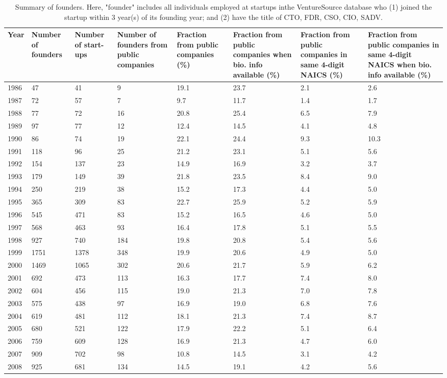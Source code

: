 \begin{table}[!htb]
\centering
\begingroup\scriptsize
\begin{tabular}{p{1.75cm}p{1.75cm}p{1.75cm}p{1.75cm}p{1.75cm}p{1.75cm}p{1.75cm}p{1.75cm}}
  \toprule
Year & Number of founders & Number of start-ups & Number of founders from public companies & Fraction from public companies (\%) & Fraction from public companies when bio. info available (\%) & Fraction from public companies in same 4-digit NAICS (\%) & Fraction from public companies in same 4-digit NAICS when bio. info available (\%) \\ 
  \midrule
1986 & 47 & 41 &  9 & 19.1 & 23.7 & 2.1 & 2.6 \\ 
  1987 & 72 & 57 &  7 & 9.7 & 11.7 & 1.4 & 1.7 \\ 
  1988 & 77 & 72 & 16 & 20.8 & 25.4 & 6.5 & 7.9 \\ 
  1989 & 97 & 77 & 12 & 12.4 & 14.5 & 4.1 & 4.8 \\ 
  1990 & 86 & 74 & 19 & 22.1 & 24.4 & 9.3 & 10.3 \\ 
  1991 & 118 & 96 & 25 & 21.2 & 23.1 & 5.1 & 5.6 \\ 
  1992 & 154 & 137 & 23 & 14.9 & 16.9 & 3.2 & 3.7 \\ 
  1993 & 179 & 149 & 39 & 21.8 & 23.5 & 8.4 & 9.0 \\ 
  1994 & 250 & 219 & 38 & 15.2 & 17.3 & 4.4 & 5.0 \\ 
  1995 & 365 & 309 & 83 & 22.7 & 25.9 & 5.2 & 5.9 \\ 
  1996 & 545 & 471 & 83 & 15.2 & 16.5 & 4.6 & 5.0 \\ 
  1997 & 568 & 463 & 93 & 16.4 & 17.8 & 5.1 & 5.5 \\ 
  1998 & 927 & 740 & 184 & 19.8 & 20.8 & 5.4 & 5.6 \\ 
  1999 & 1751 & 1378 & 348 & 19.9 & 20.6 & 4.9 & 5.0 \\ 
  2000 & 1469 & 1065 & 302 & 20.6 & 21.7 & 5.9 & 6.2 \\ 
  2001 & 692 & 473 & 113 & 16.3 & 17.7 & 7.4 & 8.0 \\ 
  2002 & 604 & 456 & 115 & 19.0 & 21.3 & 7.0 & 7.8 \\ 
  2003 & 575 & 438 & 97 & 16.9 & 19.0 & 6.8 & 7.6 \\ 
  2004 & 619 & 481 & 112 & 18.1 & 21.3 & 7.4 & 8.7 \\ 
  2005 & 680 & 521 & 122 & 17.9 & 22.2 & 5.1 & 6.4 \\ 
  2006 & 759 & 609 & 128 & 16.9 & 21.3 & 4.7 & 6.0 \\ 
  2007 & 909 & 702 & 98 & 10.8 & 14.5 & 3.1 & 4.2 \\ 
  2008 & 925 & 681 & 134 & 14.5 & 19.1 & 4.2 & 5.6 \\ 
   \bottomrule
\end{tabular}
\endgroup
\caption{Summary of founders. Here, "founder" includes all individuals employed at startups inthe VentureSource database who (1) joined the startup within 3 year(s) of its founding year; and (2) have the title of CTO, FDR, CSO, CIO, SADV.} 
\label{table:GStable_technical}
\end{table}

